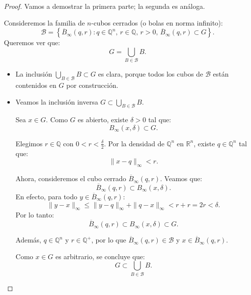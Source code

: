 \begin{proof}
    Vamos a demostrar la primera parte; la segunda es análoga.

    Consideremos la familia de $n$-cubos cerrados (o bolas en norma infinito):
    \[
        \mathcal{B} = \left\{ \overline{B}_\infty(q, r) : q \in \mathbb{Q}^n, \, r \in \mathbb{Q}, \, r > 0, \, \overline{B}_\infty(q, r) \subset G \right\}.
    \]
    Queremos ver que:
    \[
        G = \bigcup_{B \in \mathcal{B}} B.
    \]

    \begin{itemize}
        \item La inclusión \(\bigcup_{B \in \mathcal{B}} B \subset G\) es clara, porque todos los cubos de \(\mathcal{B}\) están contenidos en \(G\) por construcción.
        \item Veamos la inclusión inversa \(G \subset \bigcup_{B \in \mathcal{B}} B\).

    Sea \(x \in G\). Como \(G\) es abierto, existe \(\delta > 0\) tal que:
    \[
        B_\infty(x, \delta) \subset G.
    \]

    Elegimos \(r \in \mathbb{Q}\) con \(0 < r < \frac{\delta}{2}\). Por la densidad de \(\mathbb{Q}^n\) en \(\mathbb{R}^n\), existe \(q \in \mathbb{Q}^n\) tal que:
    \[
        \|x - q\|_\infty < r.
    \]

    Ahora, consideremos el cubo cerrado \(\overline{B}_\infty(q, r)\). Veamos que:
    \[
        \overline{B}_\infty(q, r) \subset B_\infty(x, \delta).
    \]
    En efecto, para todo \(y \in \overline{B}_\infty(q, r)\):
    \[
        \|y - x\|_\infty \leq \|y - q\|_\infty + \|q - x\|_\infty < r + r = 2r < \delta.
    \]
    Por lo tanto:
    \[
        \overline{B}_\infty(q, r) \subset B_\infty(x, \delta) \subset G.
    \]

    Además, \(q \in \mathbb{Q}^n\) y \(r \in \mathbb{Q}^+\), por lo que \(\overline{B}_\infty(q, r) \in \mathcal{B}\) y \(x \in \overline{B}_\infty(q, r)\).

    Como \(x \in G\) es arbitrario, se concluye que:
    \[
        G \subset \bigcup_{B \in \mathcal{B}} B.
    \]
    \end{itemize}
    

\end{proof}
